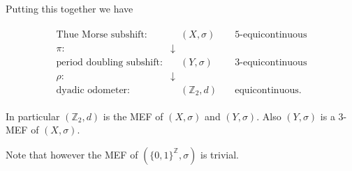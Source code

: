 \begin{frame}
	Putting this together we have
	\medskip
	
	\begin{align*}
		\begin{array}{rcc}
			\text{Thue Morse subshift:} &\quad (X, \sigma) \quad &5\text{-equicontinuous}\\
			\pi: &\downarrow &\\
			\text{period doubling subshift:} &\quad (Y, \sigma) \quad &3\text{-equicontinuous}\\
			\rho: &\downarrow &\\
			\text{dyadic odometer:} &\quad (\mathbb{Z}_2, d) \quad &\text{equicontinuous.}
		\end{array}
	\end{align*}
	\medskip

	In particular $(\mathbb{Z}_2, d)$ is the MEF of $(X, \sigma)$ and $(Y, \sigma)$. Also $(Y, \sigma)$ is a $3$-MEF of $(X, \sigma)$.
	
	Note that however the MEF of $(\{0, 1\}^\mathbb{Z}, \sigma)$ is trivial.
\end{frame}